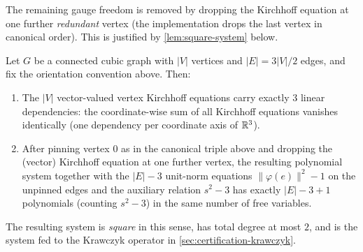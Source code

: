 The remaining gauge freedom is removed by dropping the Kirchhoff
equation at one further \emph{redundant} vertex (the implementation
drops the last vertex in canonical order). This is justified by
\cref{lem:square-system} below.

\begin{lemma}
\label{lem:square-system}
Let $G$ be a connected cubic graph with $|V|$ vertices and $|E| = 3|V|/2$
edges, and fix the orientation convention above. Then:
\begin{enumerate}[label=(\roman*)]
  \item The $|V|$ vector-valued vertex Kirchhoff equations carry
        exactly $3$ linear dependencies: the coordinate-wise sum of
        all Kirchhoff equations vanishes identically (one dependency
        per coordinate axis of $\mathbb{R}^{3}$).
  \item After pinning vertex $0$ as in the canonical triple above
        and dropping the (vector) Kirchhoff equation at one further
        vertex, the resulting polynomial system together with the
        $|E|-3$ unit-norm equations $\lVert \varphi(e) \rVert^{2} - 1$
        on the unpinned edges and the auxiliary relation $s^{2} - 3$
        has exactly $|E| - 3 + 1$ polynomials (counting $s^{2} - 3$)
        in the same number of free variables.
\end{enumerate}
The resulting system is \emph{square} in this sense, has total degree
at most $2$, and is the system fed to the Krawczyk operator in
\cref{sec:certification-krawczyk}.
\end{lemma}


